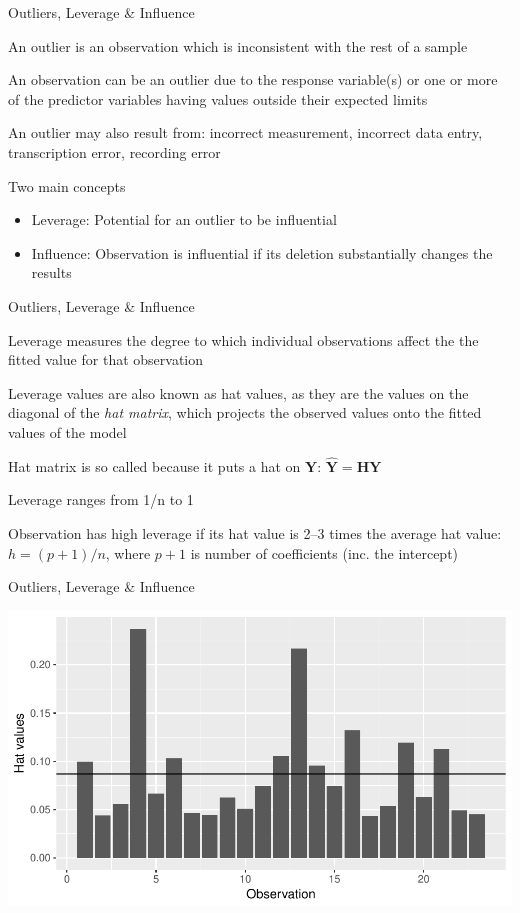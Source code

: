 \documentclass[10pt,ignorenonframetext,compress, aspectratio=169]{beamer}
\providecommand{\tightlist}{%
  \setlength{\itemsep}{0pt}\setlength{\parskip}{0pt}}
\begin{document}
\begin{frame}{Outliers, Leverage \& Influence}

An \alert{outlier} is an observation which is inconsistent with the rest
of a sample

An observation can be an outlier due to the response variable(s) or one
or more of the predictor variables having values outside their expected
limits

An outlier may also result from: incorrect measurement, incorrect data
entry, transcription error, recording error

Two main concepts

\begin{itemize}
\tightlist
\item
  \alert{Leverage}: Potential for an outlier to be influential
\item
  \alert{Influence}: Observation is influential if its deletion
  substantially changes the results
\end{itemize}

\end{frame}

\begin{frame}{Outliers, Leverage \& Influence}

\alert{Leverage} measures the degree to which individual observations
affect the the fitted value for that observation

Leverage values are also known as \alert{hat values}, as they are the
values on the diagonal of the \emph{hat matrix}, which projects the
observed values onto the fitted values of the model

Hat matrix is so called because it puts a \alert{hat on} \(\mathbf{Y}\):
\(\mathbf{\hat{Y} = HY}\)

Leverage ranges from 1/n to 1

Observation has high leverage if its hat value is 2--3 times the average
hat value: \(h = (p+1)/n\), where \(p+1\) is number of coefficients
(inc. the intercept)

\end{frame}

\begin{frame}{Outliers, Leverage \& Influence}

\begin{center}\includegraphics[width=0.7\linewidth]{03-linear-models_files/figure-beamer/svmod-hatvalues-plot-1} \end{center}

\end{frame}
\end{document}
